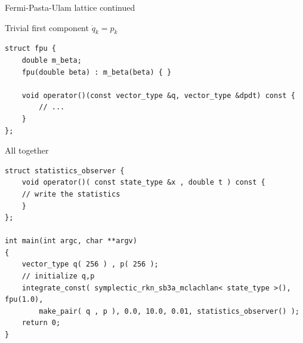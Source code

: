 \begin{frame}[fragile]{Fermi-Pasta-Ulam lattice continued}

  Trivial first component $\dot{q}_k = p_k$

  \begin{lstlisting}
struct fpu {
    double m_beta;
    fpu(double beta) : m_beta(beta) { }

    void operator()(const vector_type &q, vector_type &dpdt) const {
        // ...
    }
};
  \end{lstlisting}

  \pause

  \vspace{2ex}

  All together

  \begin{lstlisting}
struct statistics_observer {
    void operator()( const state_type &x , double t ) const { 
    // write the statistics
    }
};

int main(int argc, char **argv)
{
    vector_type q( 256 ) , p( 256 );
    // initialize q,p
    integrate_const( symplectic_rkn_sb3a_mclachlan< state_type >(), fpu(1.0),
        make_pair( q , p ), 0.0, 10.0, 0.01, statistics_observer() );
    return 0;
}
  \end{lstlisting}



\end{frame}




\frame{\tableofcontents[currentsection]}





